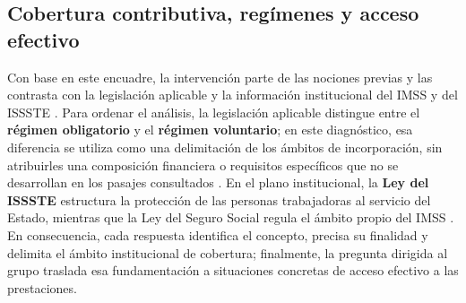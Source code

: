\documentclass[12pt,letterpaper,oneside]{article}
\begin{document}
\subsection{Cobertura contributiva, regímenes y acceso efectivo}
Con base en este encuadre, la intervención parte de las nociones previas y las contrasta con la legislación aplicable y la información institucional del IMSS y del ISSSTE \citep{lss2026,imssSitio2026,isssteSitio2026}. Para ordenar el análisis, la legislación aplicable distingue entre el \textbf{régimen obligatorio} y el \textbf{régimen voluntario}; en este diagnóstico, esa diferencia se utiliza como una delimitación de los ámbitos de incorporación, sin atribuirles una composición financiera o requisitos específicos que no se desarrollan en los pasajes consultados \citep{lss2026}. En el plano institucional, la \textbf{Ley del ISSSTE} estructura la protección de las personas trabajadoras al servicio del Estado, mientras que la Ley del Seguro Social regula el ámbito propio del IMSS \citep{lss2026,isssteSitio2026}. En consecuencia, cada respuesta identifica el concepto, precisa su finalidad y delimita el ámbito institucional de cobertura; finalmente, la pregunta dirigida al grupo traslada esa fundamentación a situaciones concretas de acceso efectivo a las prestaciones.
\end{document}

